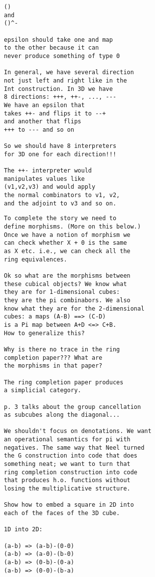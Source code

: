 \documentclass[authoryear,preprint]{sigplanconf}
\begin{document}
\begin{verbatim}
() 
and 
()^-

epsilon should take one and map
to the other because it can
never produce something of type 0

In general, we have several direction
not just left and right like in the
Int construction. In 3D we have
8 directions: +++, ++-, ..., ---
We have an epsilon that 
takes ++- and flips it to --+
and another that flips
+++ to --- and so on

So we should have 8 interpreters
for 3D one for each direction!!!

The ++- interpreter would 
manipulates values like
(v1,v2,v3) and would apply
the normal combinators to v1, v2, 
and the adjoint to v3 and so on.
\end{verbatim}





\begin{verbatim}
To complete the story we need to 
define morphisms. (More on this below.)
Once we have a notion of morphism we 
can check whether X + 0 is the same
as X etc. i.e., we can check all the 
ring equivalences. 

Ok so what are the morphisms between 
these cubical objects? We know what
they are for 1-dimensional cubes: 
they are the pi combinabors. We also
know what they are for the 2-dimensional 
cubes: a maps (A-B) ==> (C-D) 
is a Pi map between A+D <=> C+B. 
How to generalize this? 

Why is there no trace in the ring 
completion paper??? What are 
the morphisms in that paper?

The ring completion paper produces
a simplicial category.

p. 3 talks about the group cancellation
as subcubes along the diagonal... 

We shouldn't focus on denotations. We want
an operational semantics for pi with 
negatives. The same way that Neel turned
the G construction into code that does
something neat; we want to turn that 
ring completion construction into code
that produces h.o. functions without
losing the multiplicative structure.

Show how to embed a square in 2D into
each of the faces of the 3D cube.

1D into 2D:

(a-b) => (a-b)-(0-0)
(a-b) => (a-0)-(b-0)
(a-b) => (0-b)-(0-a)
(a-b) => (0-0)-(b-a)

\end{verbatim}
\end{document}
